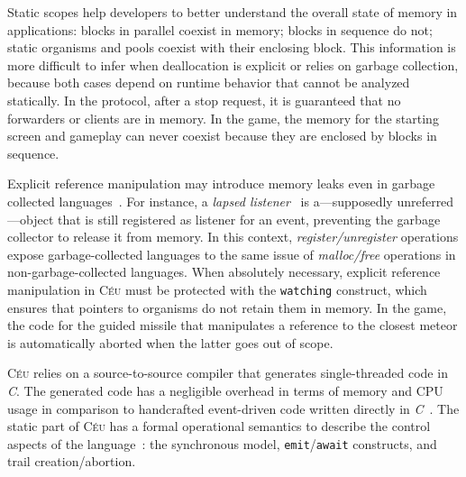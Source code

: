 \documentclass{sigplanconf}
\newcommand{\CEU}{\textsc{C\'{e}u}\xspace}
\newcommand{\code}[1] {{\small{\texttt{#1}}}}
\newcommand{\1}{\;}
\newcommand{\2}{\;\;}
\newcommand{\3}{\;\;\;}
\newcommand{\5}{\;\;\;\;\;}
\begin{document}
Static scopes help developers to better understand the overall state of memory 
in applications: blocks in parallel coexist in memory; blocks in sequence do 
not; static organisms and pools coexist with their enclosing block.
%
This information is more difficult to infer when deallocation is explicit or 
relies on garbage collection, because both cases depend on runtime behavior 
that cannot be analyzed statically.
%
In the protocol, after a stop request, it is guaranteed that no forwarders or 
clients are in memory.
In the game, the memory for the starting screen and gameplay can never coexist 
because they are enclosed by blocks in sequence.

Explicit reference manipulation may introduce memory leaks even in garbage 
collected languages~\cite{dobbs.loiterers}.
For instance, a \emph{lapsed listener}~\cite{gamepatterns} is a---supposedly 
unreferred---object that is still registered as listener for an event, 
preventing the garbage collector to release it from memory.
In this context, \emph{register/unregister} operations expose garbage-collected 
languages to the same issue of \emph{malloc/free} operations in 
non-garbage-collected languages.
%
When absolutely necessary, explicit reference manipulation in \CEU must be 
protected with the \code{watching} construct, which ensures that pointers to 
organisms do not retain them in memory.
%
In the game, the code for the guided missile that manipulates a reference to 
the closest meteor is automatically aborted when the latter goes out of scope.

\CEU relies on a source-to-source compiler that generates single-threaded code 
in \emph{C}.
The generated code has a negligible overhead in terms of memory and CPU usage 
in comparison to handcrafted event-driven code written directly in 
\emph{C}~\cite{ceu.sensys13}.
The static part of \CEU has a formal operational semantics to describe the 
control aspects of the language~\cite{ceu.rem13}: the synchronous model, 
\code{emit}/\code{await} constructs, and trail creation/abortion.

\end{document}
